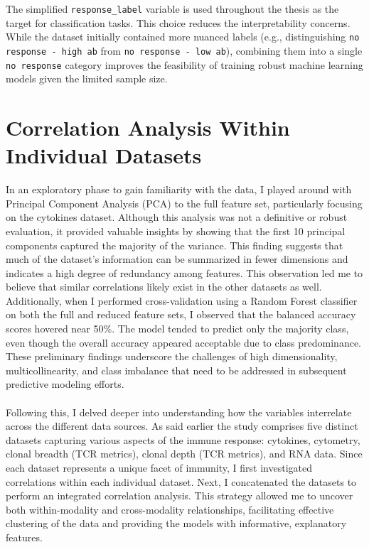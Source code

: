 \documentclass[12pt,a4paper]{report}
\begin{document}
\noindent
The simplified \texttt{response\_label} variable is used throughout the thesis as the target for classification tasks. This choice reduces the interpretability concerns. While the dataset initially contained more nuanced labels (e.g., distinguishing \texttt{no response - high ab} from \texttt{no response - low ab}), combining them into a single \texttt{no response} category improves the feasibility of training robust machine learning models given the limited sample size.

\pagebreak

\section{Correlation Analysis Within Individual Datasets}
\label{sec:correlation_analysis_within_individual_datasets}
\noindent
In an exploratory phase to gain familiarity with the data, I played around with Principal Component Analysis (PCA) to the full feature set, particularly focusing on the cytokines dataset. Although this analysis was not a definitive or robust evaluation, it provided valuable insights by showing that the first 10 principal components captured the majority of the variance. This finding suggests that much of the dataset’s information can be summarized in fewer dimensions and indicates a high degree of redundancy among features. This observation led me to believe that similar correlations likely exist in the other datasets as well. Additionally, when I performed cross-validation using a Random Forest classifier on both the full and reduced feature sets, I observed that the balanced accuracy scores hovered near 50\%. The model tended to predict only the majority class, even though the overall accuracy appeared acceptable due to class predominance. These preliminary findings underscore the challenges of high dimensionality, multicollinearity, and class imbalance that need to be addressed in subsequent predictive modeling efforts.\\
\\
Following this, I delved deeper into understanding how the variables interrelate across the different data sources. As said earlier the study comprises five distinct datasets capturing various aspects of the immune response: cytokines, cytometry, clonal breadth (TCR metrics), clonal depth (TCR metrics), and RNA data. Since each dataset represents a unique facet of immunity, I first investigated correlations within each individual dataset. Next, I concatenated the datasets to perform an integrated correlation analysis. This strategy allowed me to uncover both within-modality and cross-modality relationships, facilitating effective clustering of the data and providing the models with informative, explanatory features.
\end{document}
